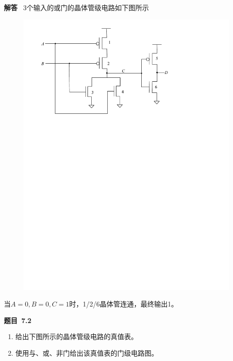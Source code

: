 \documentclass[10pt,a4paper,UTF8]{ctexart}
\newcommand{\problemname}{待定义}
\newenvironment{problem}{\begin{shaded}\par\noindent\textbf{题目\  \problemname}}{\end{shaded}\par}
\newenvironment{solution}{\par\noindent\textbf{解答}\ }{\par}
\begin{document}
\begin{solution}
	3个输入的或门的晶体管级电路如下图所示
	\begin{figure}[H]
		\centering
		\includegraphics[scale=0.6]{img/7.1b.pdf}
	\end{figure}
	当$A=0,B=0,C=1$时，1/2/6晶体管连通，最终输出1。
\end{solution}


\renewcommand{\problemname}{7.2}
\begin{problem}
	\begin{enumerate}[(1)]
		\item 给出下图所示的晶体管级电路的真值表。
		\item 使用与、或、非门给出该真值表的门级电路图。
	\end{enumerate}
\end{problem}
\end{document}
